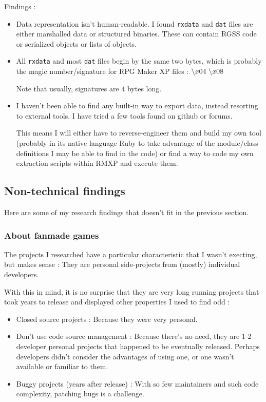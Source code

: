 \documentclass[11pt]{article}
\newcommand\BS{\char`\\}
\begin{document}
Findings :
\begin{itemize}
	\item Data representation isn't human-readable. I found \verb|rxdata| and \verb|dat| files are either marshalled data or structured binaries. These can contain RGSS code or serialized objects or lists of objects.
	
	\item All \verb|rxdata| and most \verb|dat| files begin by the same two bytes, which is probably the magic number/signature for RPG Maker XP files : $\BS x04 \ \BS x08$
	
	Note that usually, signatures are 4 bytes long.
	
	\item I haven't been able to find any built-in way to export data, instead resorting to external tools. I have tried a few tools found on github or forums. %
	
	This means I will either have to reverse-engineer them and build my own tool (probably in its native language Ruby to take advantage of the module/class definitions I may be able to find in the code) or find a way to code my own extraction scripts within RMXP and execute them.
\end{itemize}



\subsection{Non-technical findings}

Here are some of my research findings that doesn't fit in the previous section. 

\subsubsection{About fanmade games}

The projects I researched have a particular characteristic that I wasn't execting, but makes sense : They are personal side-projects from (mostly) individual developers. 

With this in mind, it is no surprise that they are very long running projects that took years to release and displayed other properties I used to find odd :
\begin{itemize}
	\item Closed source projects : Because they were very personal.
	\item Don't use code source management : Because there's no need, they are 1-2 developer personal projects that happened to be eventually released. Perhaps developers didn't consider the advantages of using one, or one wasn't available or familiar to them.
	\item Buggy projects (years after release) : With so few maintainers and such code complexity, patching bugs is a challenge.
\end{itemize} 
\end{document}
